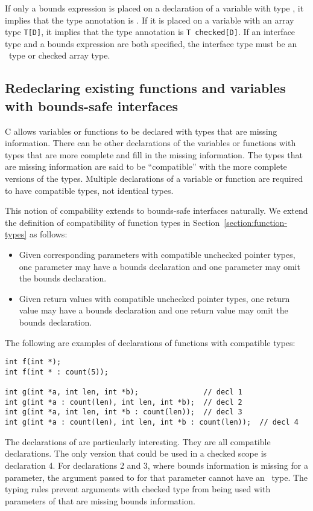 If only a bounds expression is placed on a declaration of a variable with type ,
it implies that the type annotation is .   If it is placed on a variable with an
array type \lstinline{T[D]}, it implies that the type annotation is \lstinline{T checked[D]}.   If
an interface type and a bounds expression are both specified, the interface type must
be an \arrayptr\ type or checked array type.

\subsection{Redeclaring existing functions and variables with bounds-safe interfaces}
\label{section:bounds-safe-interface-redeclaration}

C allows variables or functions to be declared with types that are missing information.
There can be other declarations of the variables or functions with types that are more complete
and fill in the missing information.  The types that are missing information are said to be
``compatible'' with the more complete versions of the types.  Multiple declarations of
a variable or function are required to have compatible types, not identical types.

This notion of compability extends to bounds-safe interfaces naturally.  We extend the
definition of compatibility of function types in Section~\ref{section:function-types} as follows:
\begin{itemize}
\item Given corresponding parameters with compatible unchecked pointer types,
one parameter may have a bounds declaration and one parameter may omit the bounds declaration.
\item Given return values with compatible unchecked pointer types, one
return value may have a bounds declaration and one return value may omit the bounds declaration.
\end{itemize}

The following are examples of declarations of functions with compatible types:
\begin{lstlisting}
int f(int *);
int f(int * : count(5));

int g(int *a, int len, int *b);               // decl 1
int g(int *a : count(len), int len, int *b);  // decl 2
int g(int *a, int len, int *b : count(len));  // decl 3
int g(int *a : count(len), int len, int *b : count(len));  // decl 4
\end{lstlisting}
The declarations of  are particularly interesting. They are all
compatible declarations.  The only version
that could be used in a checked scope is declaration 4.   For declarations 2 and 3,
where bounds information is missing for a parameter, the argument passed to 
for that parameter cannot have an \arrayptr\ type.  The typing rules prevent arguments
with checked type from being used with parameters of  that are missing
bounds information.

